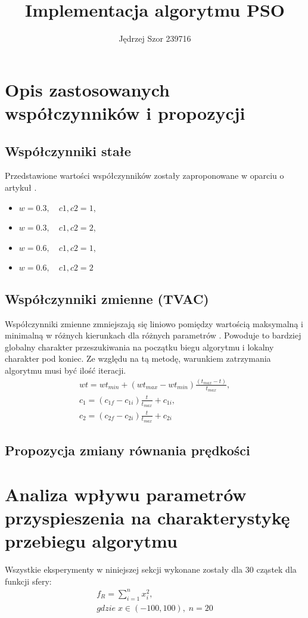 \documentclass[12pt]{article}
\begin{document}
\author{Jędrzej Szor 239716}
\title{\\\textbf{Implementacja algorytmu PSO}}
\maketitle

\section{Opis zastosowanych współczynników i propozycji}
\subsection{Współczynniki stałe}
Przedstawione wartości współczynników zostały zaproponowane w oparciu o artykuł \cite{parameters}.
\begin{itemize}
    \item $w = 0.3,\quad c1, c2 = 1$,
    \item $w = 0.3,\quad c1, c2 = 2$,
    \item $w = 0.6,\quad c1, c2 = 1$,
    \item $w = 0.6,\quad c1, c2 = 2$
\end{itemize}
\subsection{Współczynniki zmienne (TVAC)}
Współczynniki zmienne zmniejszają się liniowo pomiędzy wartością maksymalną i minimalną w różnych kierunkach dla różnych parametrów \cite{tvac}. Powoduje to bardziej globalny charakter przeszukiwania na początku biegu algorytmu i lokalny charakter pod koniec. Ze względu na tą metodę, warunkiem zatrzymania algorytmu musi być ilość iteracji.
\begin{gather}
    wt = wt_{min} + (wt_{max} - wt_{min})\frac{(t_{max} - t)}{t_{max}},\\
    c_1 = (c_{1f} - c_{1i})\frac{t}{t_{max}} + c_{1i},\\
    c_2 = (c_{2f} - c_{2i})\frac{t}{t_{max}} + c_{2i}
\end{gather}

\subsection{Propozycja zmiany równania prędkości}

\section{Analiza wpływu parametrów przyspieszenia na charakterystykę przebiegu algorytmu}
Wszystkie eksperymenty w niniejszej sekcji wykonane zostały dla 30 cząstek dla funkcji sfery:
\begin{gather}
    f_R = \sum_{i=1}^n x_i^2,\\
    gdzie\; x\in(-100, 100),\; n=20
\end{gather}
\end{document}

